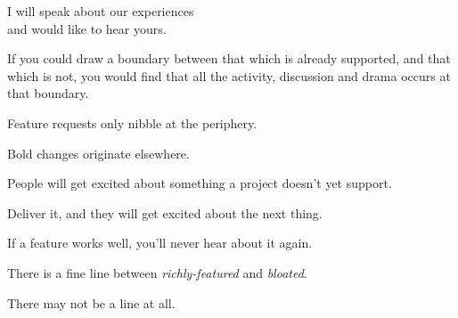 \documentclass[t,aspectratio=169]{beamer}
\begin{document}
\begin{frame}[standout]
    I will speak about our experiences \\
    and would like to hear yours.
\end{frame}

\begin{frame}[fragile] %
    \vfill
       
\end{frame}

\begin{frame}[fragile] %
    \vfill
     
\end{frame}

\begin{frame}[fragile] %
    \vfill
    If you could draw a boundary between that which is already supported, and that which is not, \pause you would find that all the activity, discussion and drama occurs at that boundary. \pause

    Feature requests only nibble at the periphery. \pause

    Bold changes originate elsewhere.
\end{frame}

\begin{frame}[fragile]%
    \vfill
    People will get excited about something a project doesn't yet support. \pause

    Deliver it, and they will get excited about the next thing.
\end{frame}

\begin{frame}[fragile]%
    \vfill
    If a feature works well, you'll never hear about it again.
\end{frame}

\begin{frame}[fragile]%
    \vfill
    There is a fine line between \textit{richly-featured} and \textit{bloated}. \pause

    There may not be a line at all.
\end{frame}
\end{document}
